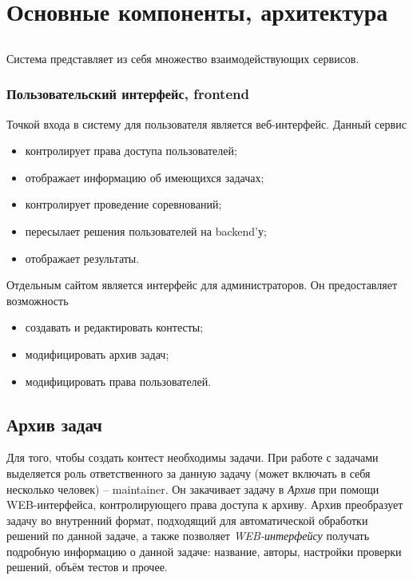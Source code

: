 \chapter{Основные компоненты, архитектура}

\section{}
Система представляет из себя множество взаимодействующих сервисов.



\subsection{Пользовательский интерфейс, frontend}
Точкой входа в систему для пользователя является веб-интерфейс.
Данный сервис 
\begin{itemize}
    \item контролирует права доступа пользователей;
    \item отображает информацию об имеющихся задачах;
    \item контролирует проведение соревнований;
    \item пересылает решения пользователей на backend'у;
    \item отображает результаты.
\end{itemize}

Отдельным сайтом является интерфейс для администраторов.
Он предоставляет возможность
\begin{itemize}
    \item создавать и редактировать контесты;
    \item модифицировать архив задач;
    \item модифицировать права пользователей.
\end{itemize}

\section{Архив задач}
Для того, чтобы создать контест необходимы задачи.
При работе с задачами выделяется роль ответственного за данную задачу (может включать в себя
несколько человек) -- maintainer. Он закачивает задачу в \textit{Архив} при помощи WEB-интерфейса,
контролирующего права доступа к архиву. Архив преобразует задачу во внутренний формат,
подходящий для автоматической обработки решений по данной задаче, а также позволяет
\textit{WEB-интерфейсу} получать подробную информацию о данной задаче:
название, авторы, настройки проверки решений, объём тестов и прочее.

